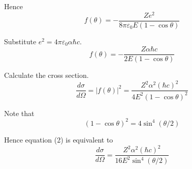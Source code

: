Hence
\begin{equation*}
f(\theta)=-\frac{Ze^2}{8\pi\varepsilon_0E(1-\cos\theta)}
\end{equation*}

Substitute $e^2=4\pi\varepsilon_0\alpha\hbar c$.
\begin{equation*}
f(\theta)=-\frac{Z\alpha\hbar c}{2E(1-\cos\theta)}
\end{equation*}

Calculate the cross section.
\begin{equation*}
\frac{d\sigma}{d\Omega}=|f(\theta)|^2
=\frac{Z^2\alpha^2(\hbar c)^2}{4E^2(1-\cos\theta)^2}
\tag{2}
\end{equation*}

Note that
\begin{equation*}
(1-\cos\theta)^2=4\sin^4(\theta/2)
\end{equation*}

Hence equation (2) is equivalent to
\begin{equation*}
\frac{d\sigma}{d\Omega}=\frac{Z^2\alpha^2(\hbar c)^2}{16E^2\sin^4(\theta/2)}
\tag{3}
\end{equation*}


